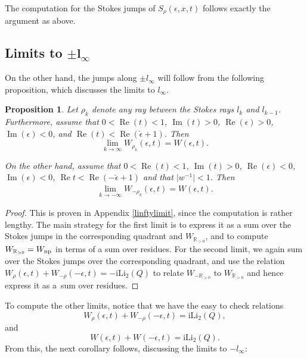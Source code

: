 \documentclass[pdftex]{sigma}
\numberwithin{equation}{section}
\newtheorem{Proposition}[Theorem]{Proposition}
 { \theoremstyle{definition}
\newtheorem{Definition}[Theorem]{Definition}
\newtheorem{Note}[Theorem]{Note}
\newtheorem{Example}[Theorem]{Example}
\newtheorem{Remark}[Theorem]{Remark} }
\begin{document}
The computation for the Stokes jumps of $S_{\rho}(\epsilon,x,t)$ follows exactly the argument as above.

\subsection[Limits to $\pm l_{\infty}$]{Limits to $\boldsymbol{\pm l_{\infty}}$}

On the other hand, the jumps along $\pm l_{\infty}$ will follow from the following proposition, which discusses the limits to $l_{\infty}$.

\begin{Proposition}\label{rblimit1} Let $\rho_k$ denote any ray between the Stokes rays $l_{k}$ and $l_{k-1}$. Furthermore, assume that $0<\operatorname{Re}(t)<1$, $\operatorname{Im}(t)>0$, $\operatorname{Re}(\epsilon)>0$, $\operatorname{Im}(\epsilon)<0$, and $\operatorname{Re}(t) < \operatorname{Re} (\check{\epsilon}+1)$. Then
\begin{equation*}
 \lim_{k\to \infty}W_{\rho_k}(\epsilon,t)=W(\epsilon,t).
\end{equation*}

On the other hand, assume that $0<\operatorname{Re}(t)<1$, $\operatorname{Im}(t)>0$, $\operatorname{Re}(\epsilon)<0$, $\operatorname{Im}(\epsilon)<0$, $\operatorname{Re} t < \operatorname{Re} (-\check{\epsilon}+1)$ and that $\big|w^{-1}\big|<1$. Then
\begin{equation*}
 \begin{split}
\lim_{k\to -\infty}W_{-\rho_k}(\epsilon,t)=W(\epsilon,t).
 \end{split}
\end{equation*}
\end{Proposition}
\begin{proof}
 This is proven in Appendix \ref{linftylimit}, since the computation is rather lengthy. The main strategy for the first limit is to express it as a sum over the Stokes jumps in the corresponding quadrant and $W_{\mathbb{R}_{>0}}$, and to compute $W_{\mathbb{R}_{>0}}=W_{{\rm np}}$ in terms of a sum over residues. For the second limit, we again sum over the Stokes jumps over the corresponding quadrant, and use the relation $ W_{\rho}(\epsilon,t)+W_{-\rho}(-\epsilon,t)=-\mathrm{i}\mathrm{Li}_2(Q) $ to relate $W_{-\mathbb{R}_{>0}}$ to $W_{\mathbb{R}_{>0}}$ and hence express it as a~sum over residues.
\end{proof}

To compute the other limits, notice that we have the easy to check relations
\begin{equation}\label{reflection1}
 W_{\rho}(\epsilon,t)+W_{-\rho}(-\epsilon,t)=\mathrm{i}\mathrm{Li}_2(Q),
\end{equation}
and
\begin{equation}\label{reflection2}
 W(\epsilon,t)+W(-\epsilon,t)=\mathrm{i}\mathrm{Li}_2(Q).
\end{equation}
From this, the next corollary follows, discussing the limits to $-l_{\infty}$:
\end{document}
